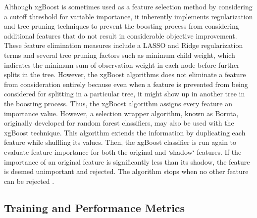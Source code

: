 \documentclass[10pt,a4paper]{article}
\newcommand{\red}[1]{{\color{red} #1}}
\begin{document}
Although xgBoost is sometimes used as a feature selection method by considering a cutoff threshold for variable importance, it inherently implements regularization and tree pruning techniques to prevent the boosting process from considering additional features that do not result in considerable objective improvement. These feature elimination measures include a LASSO and Ridge regularization terms and several tree pruning factors such as minimum child weight, which indicates the minimum sum of observation weight in each node before further splits in the tree. However, the xgBoost algorithms does not eliminate a feature from consideration entirely because even when a feature is prevented from being considered for splitting in a particular tree, it might show up in another tree in the boosting process. Thus, the xgBoost algorithm assigns every feature an importance value. However, a selection wrapper algorithm, known as Boruta, originally developed for random forest classifiers, may also be used with the xgBoost technique. This algorithm extends the information by duplicating each feature while shuffling its values. Then, the xgBoost classifier is run again to evaluate feature importance for both the original and `shadow` features. If the importance of an original feature is significantly less than its shadow, the feature is deemed unimportant and rejected. The algorithm stops when no other feature can be rejected \citep{kursa2010feature}.

\subsection{Training and Performance Metrics}\label{sse:training}
\end{document}
